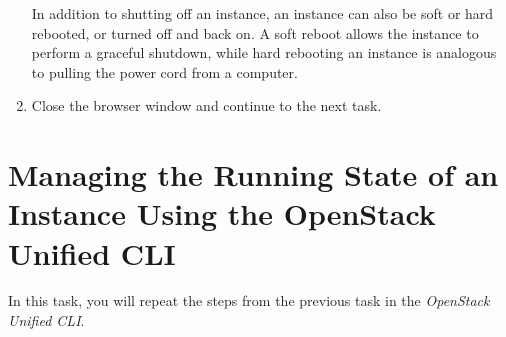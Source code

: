 \documentclass[letterpaper, 12pt]{article}
\begin{document}
\begin{enumerate}
    \begin{tipbox}
        In addition to shutting off an instance, an instance can also be soft or hard rebooted, or turned off and back on.
        A soft reboot allows the instance to perform a graceful shutdown, while hard rebooting an instance is analogous to pulling the power cord from a computer.
    \end{tipbox}

    \item Close the browser window and continue to the next task.
\end{enumerate}

\section{Managing the Running State of an Instance Using the OpenStack Unified CLI}
\label{sec:managing_the_power_state_of_an_instance_cli}
In this task, you will repeat the steps from the previous task in the \textit{OpenStack Unified CLI}.
\end{document}
